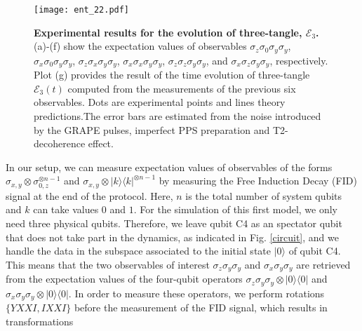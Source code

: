 \documentclass[10pt,nofootinbib,notitlepage,twocolumn,superscriptaddress]{revtex4-1}
\theoremstyle{plain}
\theoremstyle{definition}
\newcommand{\bra}[1]{\mbox{$\langle #1|$}}
\newcommand{\ket}[1]{\ensuremath{|#1\rangle}}
\begin{document}
\begin{figure*}[htb]
\begin{center}
\texttt{[image: ent\_22.pdf]}
\end{center}
\setlength{\abovecaptionskip}{-0.00cm}
\caption{\footnotesize{\textbf{Experimental results for the evolution of three-tangle, $\mathcal{E}_3$.} (a)-(f) show the expectation values of observables $\sigma_z\sigma_0\sigma_y\sigma_y$, $\sigma_x\sigma_0\sigma_y\sigma_y$, $\sigma_z\sigma_x\sigma_y\sigma_y$, $\sigma_x\sigma_x\sigma_y\sigma_y$, $\sigma_z\sigma_z\sigma_y\sigma_y$, and $\sigma_x\sigma_z\sigma_y\sigma_y$, respectively.  Plot (g) provides the result of the time evolution of three-tangle $\mathcal{E}_3(t)$ computed from the measurements of the previous six observables. Dots are experimental points and lines theory predictions.The error bars are estimated from the noise introduced by the GRAPE pulses, imperfect PPS preparation and T2-decoherence effect.} }\label{ent_2}
\end{figure*}

In our setup, we can measure expectation values of observables of the forms $\sigma_{x,y} \otimes \sigma_{0,z} ^{\otimes n-1} $ and $\sigma_{x,y} \otimes \ket{k}\bra{k} ^{\otimes n-1} $ by measuring the Free Induction Decay (FID) signal at the end of the protocol. Here, $n$ is the total number of system qubits and $k$ can take values $0$ and $1$. For the simulation of this first model, we only need three physical qubits. Therefore, we leave qubit C4 as an spectator qubit that does not take part in the dynamics, as indicated in Fig. \ref{circuit}, and we handle the data in the subspace associated to the initial state $\ket{0}$ of qubit C4. This means that the two observables of interest  $\sigma_z\sigma_y\sigma_y$ and $\sigma_x\sigma_y\sigma_y$ are retrieved from the expectation values of the four-qubit operators $\sigma_z\sigma_y\sigma_y \otimes \ket{0}\bra{0}$ and $\sigma_x\sigma_y\sigma_y\otimes \ket{0}\bra{0}$. In order to measure these operators, we perform rotations $\{YXXI,IXXI\}$ before the measurement of the FID signal, which results in transformations
\end{document}
